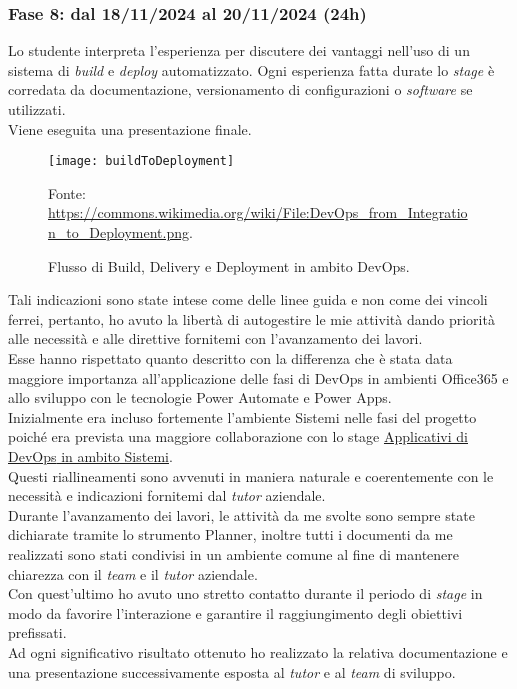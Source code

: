 \subsubsection*{Fase 8: dal 18/11/2024 al 20/11/2024 (24h) }
Lo studente interpreta l'esperienza per discutere dei vantaggi nell'uso di un sistema di \emph{build} e \emph{deploy} automatizzato. Ogni esperienza fatta durate lo \emph{stage} è corredata da documentazione, versionamento di configurazioni o \emph{software} se utilizzati.\\
Viene eseguita una presentazione finale.\\
\begin{figure}[htbp] 
    \centering 
    \texttt{[image: buildToDeployment]}
    \caption{Flusso di Build, Delivery e Deployment in ambito DevOps.} 
    \label{fig:buildToDeployment}
    \vspace{1mm}
    Fonte: \url{https://commons.wikimedia.org/wiki/File:DevOps_from_Integration_to_Deployment.png}.
\end{figure}
\newline \newline \noindent Tali indicazioni sono state intese come delle linee guida e non come dei vincoli ferrei, pertanto, ho avuto la libertà di autogestire le mie attività dando priorità alle necessità e alle direttive fornitemi con l'avanzamento dei lavori.\\
Esse hanno rispettato quanto descritto con la differenza che è stata data maggiore importanza all'applicazione delle fasi di \gls{DevOps} in ambienti Office365 e allo sviluppo con le tecnologie Power Automate e Power Apps.\\
Inizialmente era incluso fortemente l'ambiente \gls{Sistemi} nelle fasi del progetto poiché era prevista una maggiore collaborazione con lo stage \hyperref[stageDavide]{Applicativi di \gls{DevOps} in ambito Sistemi}.\\
Questi riallineamenti sono avvenuti in maniera naturale e coerentemente con le necessità e indicazioni fornitemi dal \emph{tutor} aziendale.\\
Durante l'avanzamento dei lavori, le attività da me svolte sono sempre state dichiarate tramite lo strumento Planner, inoltre tutti i documenti da me realizzati sono stati condivisi in un ambiente comune al fine di mantenere chiarezza con il \emph{team} e il \emph{tutor} aziendale.\\
Con quest'ultimo ho avuto uno stretto contatto durante il periodo di \emph{stage} in modo da favorire l'interazione e garantire il raggiungimento degli obiettivi prefissati.\\
Ad ogni significativo risultato ottenuto ho realizzato la relativa documentazione e una presentazione successivamente esposta al \emph{tutor} e al \emph{team} di sviluppo.\\

